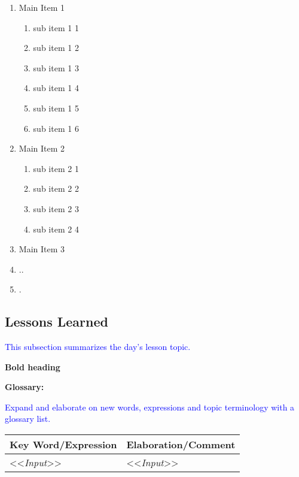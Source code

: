 {\begin{enumerate}
    \item Main Item 1
    \begin{enumerate}
        \item sub item 1 1
        \item sub item 1 2
        \item sub item 1 3
        \item sub item 1 4
        \item sub item 1 5
        \item sub item 1 6
    \end{enumerate}
    \item Main Item 2
    \begin{enumerate}
        \item sub item 2 1
        \item sub item 2 2
        \item sub item 2 3
        \item sub item 2 4
    \end{enumerate}
    \item Main Item 3
    \item ..
    \item .
\end{enumerate}


\subsection{Lessons Learned}

{\textcolor{blue}{This subsection summarizes the day's lesson topic.}}

{\bfseries{Bold heading}}

\blindtext[2]


{\bfseries{Glossary:}}

{\textcolor{blue}{Expand and elaborate on new words, expressions and topic terminology with a glossary list.}}

\begin{tabular}{p{40mm} | p{120mm}}
    {\bfseries{Key Word/Expression}} & {\bfseries{Elaboration/Comment}}\\ \hline
    <<{\emph{Input}}>> & <<{\emph{Input}}>>\\ \hline
\end{tabular}




}
